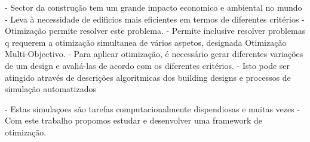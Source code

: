 \noindent 


- Sector da construção tem um grande impacto economico e ambiental no mundo
- Leva à necessidade de edificios mais eficientes em termos de diferentes critérios
- Otimização permite resolver este problema.
- Permite inclusive resolver problemas q requerem a otimização simultanea de vários aspetos, designada Otimização Multi-Objectivo. 
- Para aplicar otimização, é necessário gerar diferentes variações de um design e avaliá-las de acordo com os diferentes critérios.
- Isto pode ser atingido através de descrições algoritmicas dos building designs e processos de simulação automatizados

- Estas simulaçoes são tarefas computacionalmente dispendiosas e muitas vezes
- Com este trabalho propomos estudar e desenvolver uma framework de otimização.
